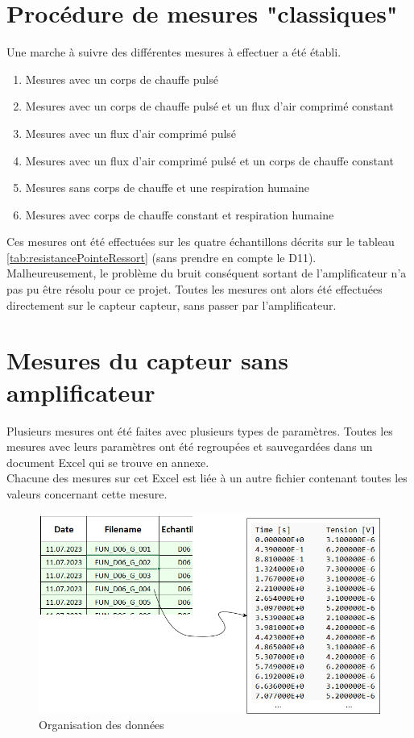 \section{Procédure de mesures "classiques"}
Une marche à suivre des différentes mesures à effectuer a été établi.
\begin{enumerate}
    \item Mesures avec un corps de chauffe pulsé\\
    \item Mesures avec un corps de chauffe pulsé et un flux d'air comprimé constant\\
    \item Mesures avec un flux d'air comprimé pulsé\\
    \item Mesures avec un flux d'air comprimé pulsé et un corps de chauffe constant\\
    \item Mesures sans corps de chauffe et une respiration humaine\\
    \item Mesures avec corps de chauffe constant et respiration humaine
\end{enumerate}
Ces mesures ont été effectuées sur les quatre échantillons décrits sur le tableau \ref{tab:resistancePointeRessort} (sans prendre en compte le D11). \\

Malheureusement, le problème du bruit conséquent sortant de l'amplificateur n'a pas pu être résolu pour ce projet. Toutes les mesures ont alors 
été effectuées directement sur le capteur \gls{capteur}, sans passer par l'amplificateur. 

\section{Mesures du capteur sans amplificateur}
Plusieurs mesures ont été faites avec plusieurs types de paramètres. Toutes les mesures avec leurs paramètres ont été regroupées et sauvegardées
dans un document Excel qui se trouve en annexe.\\
Chacune des mesures sur cet Excel est liée à un autre fichier contenant toutes les valeurs concernant cette mesure.
\begin{figure}[H]
    \centering
    \includegraphics[scale = 0.4]{assets/figures/Data.png}
    \caption{Organisation des données}
    \label{fig:data_orga}
\end{figure}


